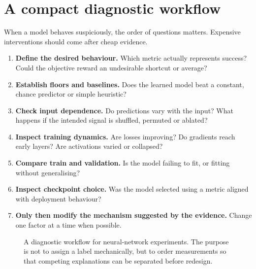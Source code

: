 \section{A compact diagnostic workflow}

When a model behaves suspiciously, the order of questions matters. Expensive interventions should come after cheap evidence.

\begin{enumerate}[leftmargin=*]
  \item \textbf{Define the desired behaviour.} Which metric actually represents success? Could the objective reward an undesirable shortcut or average?
  \item \textbf{Establish floors and baselines.} Does the learned model beat a constant, chance predictor or simple heuristic?
  \item \textbf{Check input dependence.} Do predictions vary with the input? What happens if the intended signal is shuffled, permuted or ablated?
  \item \textbf{Inspect training dynamics.} Are losses improving? Do gradients reach early layers? Are activations varied or collapsed?
  \item \textbf{Compare train and validation.} Is the model failing to fit, or fitting without generalising?
  \item \textbf{Inspect checkpoint choice.} Was the model selected using a metric aligned with deployment behaviour?
  \item \textbf{Only then modify the mechanism suggested by the evidence.} Change one factor at a time when possible.
\end{enumerate}

\begin{figure}[ht]
  \caption{A diagnostic workflow for neural-network experiments. The purpose is not to assign a label mechanically, but to order measurements so that competing explanations can be separated before redesign.}
  \label{fig:week4-diagnostic-flow}
\end{figure}

